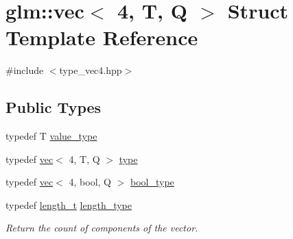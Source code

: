 \hypertarget{structglm_1_1vec_3_014_00_01_t_00_01_q_01_4}{}\section{glm\+:\+:vec$<$ 4, T, Q $>$ Struct Template Reference}
\label{structglm_1_1vec_3_014_00_01_t_00_01_q_01_4}


{\ttfamily \#include $<$type\+\_\+vec4.\+hpp$>$}

\subsection*{Public Types}
\begin{DoxyCompactItemize}
\item 
typedef T \hyperlink{structglm_1_1vec_3_014_00_01_t_00_01_q_01_4_a020e92356dcff10cc371130596325415}{value\+\_\+type}
\item 
typedef \hyperlink{structglm_1_1vec}{vec}$<$ 4, T, Q $>$ \hyperlink{structglm_1_1vec_3_014_00_01_t_00_01_q_01_4_ab2b893dfe27b0d0f154d66315f35de47}{type}
\item 
typedef \hyperlink{structglm_1_1vec}{vec}$<$ 4, bool, Q $>$ \hyperlink{structglm_1_1vec_3_014_00_01_t_00_01_q_01_4_a175b3fdeb819aab912118ac1605b675b}{bool\+\_\+type}
\item 
typedef \hyperlink{namespaceglm_a090a0de2260835bee80e71a702492ed9}{length\+\_\+t} \hyperlink{structglm_1_1vec_3_014_00_01_t_00_01_q_01_4_af1c8f56963141951f4a4724b47e072d9}{length\+\_\+type}
\begin{DoxyCompactList}\small\item\em Return the count of components of the vector. \end{DoxyCompactList}\end{DoxyCompactItemize}
